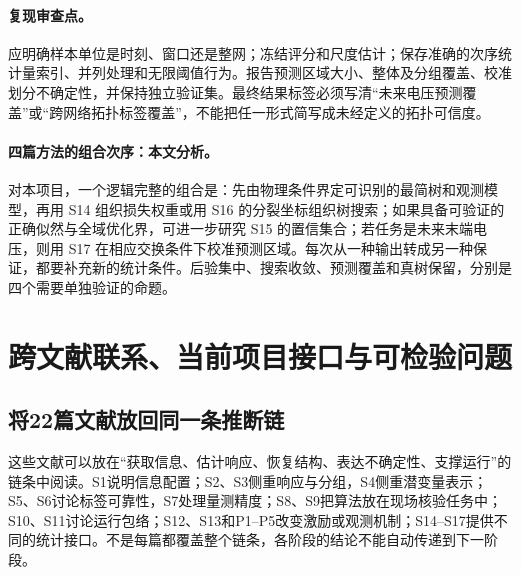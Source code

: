 \documentclass[UTF8,11pt,fontset=fandol]{ctexart}
\theoremstyle{remark}
\numberwithin{equation}{section}
\begin{document}
\paragraph{复现审查点。}
应明确样本单位是时刻、窗口还是整网；冻结评分和尺度估计；保存准确的次序统计量索引、并列处理和无限阈值行为。报告预测区域大小、整体及分组覆盖、校准划分不确定性，并保持独立验证集。最终结果标签必须写清“未来电压预测覆盖”或“跨网络拓扑标签覆盖”，不能把任一形式简写成未经定义的拓扑可信度。

\paragraph{四篇方法的组合次序：本文分析。}
对本项目，一个逻辑完整的组合是：先由物理条件界定可识别的最简树和观测模型，再用 S14 组织损失权重或用 S16 的分裂坐标组织树搜索；如果具备可验证的正确似然与全域优化界，可进一步研究 S15 的置信集合；若任务是未来末端电压，则用 S17 在相应交换条件下校准预测区域。每次从一种输出转成另一种保证，都要补充新的统计条件。后验集中、搜索收敛、预测覆盖和真树保留，分别是四个需要单独验证的命题。


\clearpage

\section{跨文献联系、当前项目接口与可检验问题}
\subsection{将22篇文献放回同一条推断链}
这些文献可以放在“获取信息、估计响应、恢复结构、表达不确定性、支撑运行”的链条中阅读。S1说明信息配置；S2、S3侧重响应与分组，S4侧重潜变量表示；S5、S6讨论标签可靠性，S7处理量测精度；S8、S9把算法放在现场核验任务中；S10、S11讨论运行包络；S12、S13和P1--P5改变激励或观测机制；S14--S17提供不同的统计接口。不是每篇都覆盖整个链条，各阶段的结论不能自动传递到下一阶段。

\begin{center}
\end{center}
\end{document}
